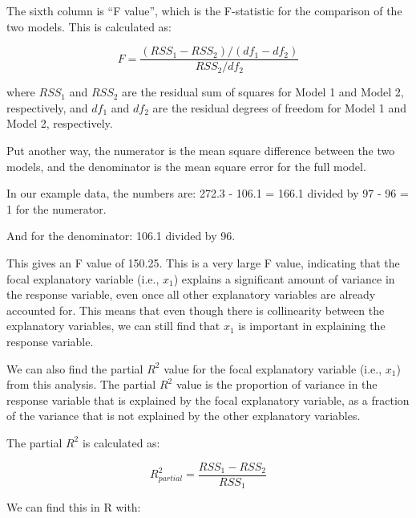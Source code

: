 \documentclass[
  letterpaper,
  8pt,
  a4paper]{book}
\newenvironment{Shaded}{\begin{snugshade}}{\end{snugshade}}
\newcommand{\DecValTok}[1]{\textcolor[rgb]{0.68,0.00,0.00}{#1}}
\newcommand{\FunctionTok}[1]{\textcolor[rgb]{0.28,0.35,0.67}{#1}}
\newcommand{\NormalTok}[1]{\textcolor[rgb]{0.00,0.23,0.31}{#1}}
\newcommand{\OtherTok}[1]{\textcolor[rgb]{0.00,0.23,0.31}{#1}}
\newcommand{\SpecialCharTok}[1]{\textcolor[rgb]{0.37,0.37,0.37}{#1}}
\newcommand{\StringTok}[1]{\textcolor[rgb]{0.13,0.47,0.30}{#1}}
\begin{document}
The sixth column is ``F value'', which is the F-statistic for the
comparison of the two models. This is calculated as:

\[F = \frac{(RSS_1 - RSS_2) / (df_1-df_2)}{RSS_2 / df_2}\]

where \(RSS_1\) and \(RSS_2\) are the residual sum of squares for Model
1 and Model 2, respectively, and \(df_1\) and \(df_2\) are the residual
degrees of freedom for Model 1 and Model 2, respectively.

Put another way, the numerator is the mean square difference between the
two models, and the denominator is the mean square error for the full
model.

In our example data, the numbers are: 272.3 - 106.1 = 166.1 divided by
97 - 96 = 1 for the numerator.

And for the denominator: 106.1 divided by 96.

This gives an F value of 150.25. This is a very large F value,
indicating that the focal explanatory variable (i.e., \(x_1\)) explains
a significant amount of variance in the response variable, even once all
other explanatory variables are already accounted for. This means that
even though there is collinearity between the explanatory variables, we
can still find that \(x_1\) is important in explaining the response
variable.

We can also find the partial \(R^2\) value for the focal explanatory
variable (i.e., \(x_1\)) from this analysis. The partial \(R^2\) value
is the proportion of variance in the response variable that is explained
by the focal explanatory variable, as a fraction of the variance that is
not explained by the other explanatory variables.

The partial \(R^2\) is calculated as:

\[R^2_{partial} = \frac{RSS_1 - RSS_2}{RSS_1}\]

We can find this in R with:

\begin{Shaded}
\end{Shaded}
\end{document}
